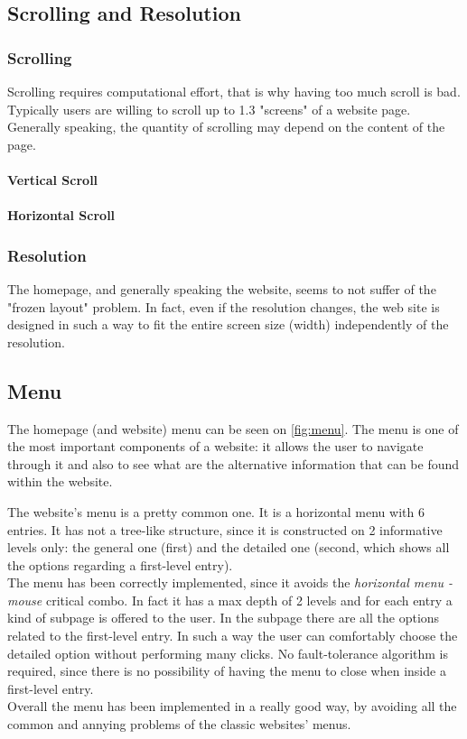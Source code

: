 \subsection{Scrolling and Resolution}
\subsubsection{Scrolling}
Scrolling requires computational effort, that is why having too much scroll is bad. Typically users are willing to scroll up to 1.3 "screens" of a website page. Generally speaking, the quantity of scrolling may depend on the content of the page.\\

\paragraph{Vertical Scroll}

\paragraph{Horizontal Scroll}

\subsubsection{Resolution}
The homepage, and generally speaking the website, seems to not suffer of the "frozen layout" problem. In fact, even if the resolution changes, the web site is designed in such a way to fit the entire screen size (width) independently of the resolution. 


\subsection{Menu}
The homepage (and website) menu can be seen on \cref{fig:menu}. The menu is one of the most important components of a website: it allows the user to navigate through it and also to see what are the alternative information that can be found within the website.

The website's menu is a pretty common one. It is a horizontal menu with 6 entries. It has not a tree-like structure, since it is constructed on 2 informative levels only: the general one (first) and the detailed one (second, which shows all the options regarding a first-level entry).\\
The menu has been correctly implemented, since it avoids the \textit{horizontal menu - mouse} critical combo. In fact it has a max depth of 2 levels and for each entry a kind of subpage is offered to the user. In the subpage there are all the options related to the first-level entry. In such a way the user can comfortably choose the detailed option without performing many clicks. No fault-tolerance algorithm is required, since there is no possibility of having the menu to close when inside a first-level entry.\\
Overall the menu has been implemented in a really good way, by avoiding all the common and annying problems of the classic websites' menus.

